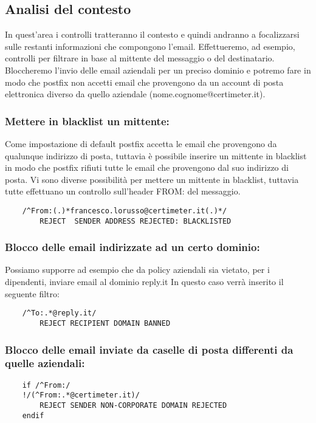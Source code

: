     \subsection{Analisi del contesto}
    In quest’area i controlli tratteranno il contesto e quindi andranno a focalizzarsi sulle restanti 
    informazioni che compongono l’email. Effettueremo, ad esempio, controlli per filtrare in base al 
    mittente del messaggio o del destinatario. 
    Bloccheremo l’invio delle email aziendali per un preciso dominio e potremo fare in modo che postfix 
    non accetti email che provengono da un account di posta elettronica diverso da quello aziendale 
    (nome.cognome@certimeter.it). 

    \subsubsection{Mettere in blacklist un mittente:}
    Come impostazione di default postfix accetta le email che provengono da qualunque indirizzo di posta, 
    tuttavia è possibile inserire un mittente in blacklist in modo che postfix rifiuti tutte le email che 
    provengono dal suo indirizzo di posta. Vi sono diverse possibilità per mettere un mittente in blacklist, 
    tuttavia tutte effettuano un controllo sull’header FROM: del messaggio.

    \begin{verbatim}
    /^From:(.)*francesco.lorusso@certimeter.it(.)*/
        REJECT  SENDER ADDRESS REJECTED: BLACKLISTED
    \end{verbatim}

    \subsubsection{Blocco delle email indirizzate ad un certo dominio:}
    Possiamo supporre ad esempio che da policy aziendali sia vietato, per i dipendenti, 
    inviare email al dominio reply.it In questo caso verrà inserito il seguente filtro:

    \begin{verbatim}
    /^To:.*@reply.it/
        REJECT RECIPIENT DOMAIN BANNED
    \end{verbatim}

    \subsubsection{Blocco delle email inviate da caselle di posta differenti da quelle aziendali:}
    \begin{verbatim}
    if /^From:/
    !/(^From:.*@certimeter.it)/ 
        REJECT SENDER NON-CORPORATE DOMAIN REJECTED
    endif
    \end{verbatim}

